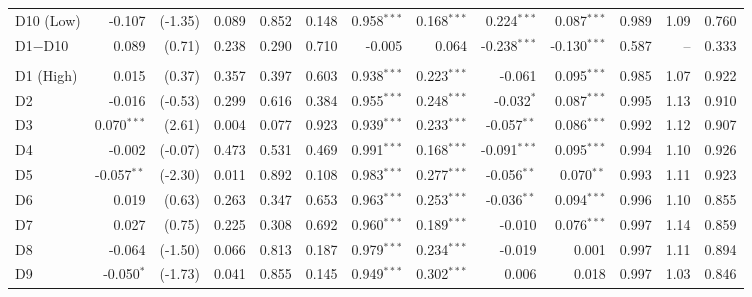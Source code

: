 \begin{table}[!htbp]
{\begin{tabular}{lrrrrrrrrrrrr}
\hspace{1em}D10 (Low) & -0.107 & (-1.35) & 0.089 & 0.852 & 0.148 & 0.958$^{***}$ & 0.168$^{***}$ & 0.224$^{***}$ & 0.087$^{***}$ & 0.989 & 1.09 & 0.760\\
\hspace{1em}D1$-$D10 & 0.089 & (0.71) & 0.238 & 0.290 & 0.710 & -0.005 & 0.064 & -0.238$^{***}$ & -0.130$^{***}$ & 0.587 & -- & 0.333\\
\addlinespace[0.3em]
\hline
\multicolumn{13}{l}{\textit{Panel F: Cross-regime (cohorts 3, 4 span a boundary)}}\\
\hspace{1em}D1 (High) & 0.015 & (0.37) & 0.357 & 0.397 & 0.603 & 0.938$^{***}$ & 0.223$^{***}$ & -0.061 & 0.095$^{***}$ & 0.985 & 1.07 & 0.922\\
\hspace{1em}D2 & -0.016 & (-0.53) & 0.299 & 0.616 & 0.384 & 0.955$^{***}$ & 0.248$^{***}$ & -0.032$^{*}$ & 0.087$^{***}$ & 0.995 & 1.13 & 0.910\\
\hspace{1em}D3 & 0.070$^{***}$ & (2.61) & 0.004 & 0.077 & 0.923 & 0.939$^{***}$ & 0.233$^{***}$ & -0.057$^{**}$ & 0.086$^{***}$ & 0.992 & 1.12 & 0.907\\
\hspace{1em}D4 & -0.002 & (-0.07) & 0.473 & 0.531 & 0.469 & 0.991$^{***}$ & 0.168$^{***}$ & -0.091$^{***}$ & 0.095$^{***}$ & 0.994 & 1.10 & 0.926\\
\hspace{1em}D5 & -0.057$^{**}$ & (-2.30) & 0.011 & 0.892 & 0.108 & 0.983$^{***}$ & 0.277$^{***}$ & -0.056$^{**}$ & 0.070$^{**}$ & 0.993 & 1.11 & 0.923\\
\hspace{1em}D6 & 0.019 & (0.63) & 0.263 & 0.347 & 0.653 & 0.963$^{***}$ & 0.253$^{***}$ & -0.036$^{**}$ & 0.094$^{***}$ & 0.996 & 1.10 & 0.855\\
\hspace{1em}D7 & 0.027 & (0.75) & 0.225 & 0.308 & 0.692 & 0.960$^{***}$ & 0.189$^{***}$ & -0.010 & 0.076$^{***}$ & 0.997 & 1.14 & 0.859\\
\hspace{1em}D8 & -0.064 & (-1.50) & 0.066 & 0.813 & 0.187 & 0.979$^{***}$ & 0.234$^{***}$ & -0.019 & 0.001 & 0.997 & 1.11 & 0.894\\
\hspace{1em}D9 & -0.050$^{*}$ & (-1.73) & 0.041 & 0.855 & 0.145 & 0.949$^{***}$ & 0.302$^{***}$ & 0.006 & 0.018 & 0.997 & 1.03 & 0.846\\

\end{tabular}}
\end{table}
